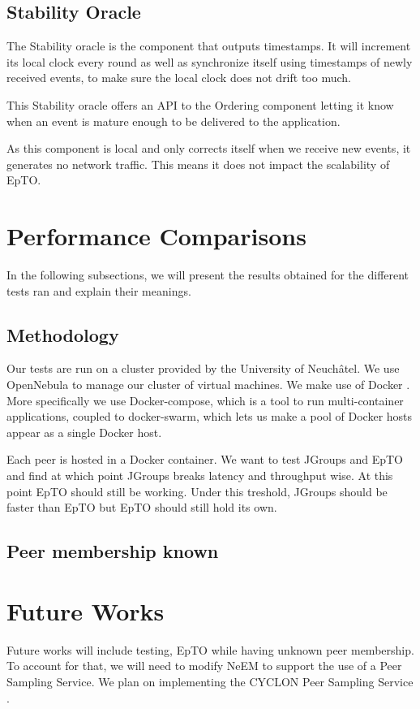 \documentclass[10pt,conference,a4paper]{IEEEtran}
\begin{document}
\subsection{Stability Oracle}
The Stability oracle is the component that outputs timestamps. It will increment its local clock every round as well as synchronize itself using timestamps of newly received events, to make sure the local clock does not drift too much.
\par
This Stability oracle offers an API to the Ordering component letting it know when an event is mature enough to be delivered to the application.
\par
As this component is local and only corrects itself when we receive new events, it generates no network traffic. This means it does not impact the scalability of EpTO.
\section{Performance Comparisons}
In the following subsections, we will present the results obtained for the different tests ran and explain their meanings.
\subsection{Methodology}
\label{sub:metho}
Our tests are run on a cluster provided by the University of Neuchâtel. We use OpenNebula \autocite{opennebula} to manage our cluster of virtual machines. We make use of Docker \autocite{docker}. More specifically we use Docker-compose, which is a tool to run multi-container applications, coupled to docker-swarm, which lets us make a pool of Docker hosts appear as a single Docker host.
\par
Each peer is hosted in a Docker container. We want to test JGroups and EpTO and find at which point JGroups breaks latency and throughput wise. At this point EpTO should still be working. Under this treshold, JGroups should be faster than EpTO but EpTO should still hold its own.
\subsection{Peer membership known}

\section{Future Works}
Future works will include testing, EpTO while having unknown peer membership. To account for that, we will need to modify NeEM to support the use of a Peer Sampling Service. We plan on implementing the CYCLON Peer Sampling Service \autocite{Voulgaris2005}.
\end{document}
